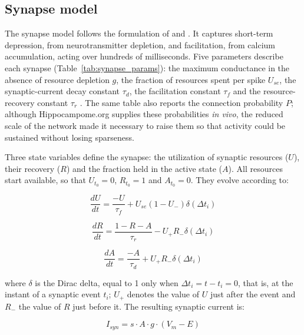 \documentclass[pdflatex,sn-basic]{sn-jnl}%
\theoremstyle{thmstyleone}%
\theoremstyle{thmstyletwo}%
\theoremstyle{thmstylethree}%
\begin{document}
\subsection{Synapse model}\label{sec:synapse_model}

The synapse model follows the formulation of \citet{sennAlgorithm2001} and \citet{mongilloSynaptic2008a}. It captures short-term
depression, from neurotransmitter depletion, and facilitation, from calcium accumulation, acting over hundreds of milliseconds.
Five parameters describe each synapse (Table~\ref{tab:synapse_params}): the maximum conductance in the absence of resource
depletion $g$, the fraction of resources spent per spike $U_{se}$, the synaptic-current decay constant $\tau_d$, the facilitation
constant $\tau_f$ and the resource-recovery constant $\tau_r$ \citep{moradiNormalized2022}. The same table also reports the
connection probability $P$; although Hippocampome.org supplies these probabilities \textit{in vivo}, the reduced scale of the
network made it necessary to raise them so that activity could be sustained without losing sparseness.

Three state variables define the synapse: the utilization of synaptic resources ($U$), their recovery ($R$) and the fraction held
in the active state ($A$). All resources start available, so that $U_{t_0} = 0$, $R_{t_0} = 1$ and $A_{t_0} = 0$. They evolve
according to:

\begin{equation}
    \label{eq_tsodyks_dU}
    \frac{dU}{dt} = \frac{-U}{\tau_f} + U_{se}(1-U_{-}) \delta(\Delta t_i)
\end{equation}

\begin{equation}
    \label{eq_tsodyks_dR}
    \frac{dR}{dt} = \frac{1-R-A}{\tau_r} - U_{+} R_{-} \delta(\Delta t_i)
\end{equation}

\begin{equation}
    \label{eq_tsodyks_dA}
    \frac{dA}{dt} = \frac{-A}{\tau_d} + U_{+} R_{-} \delta(\Delta t_i)
\end{equation}

where $\delta$ is the Dirac delta, equal to 1 only when $\Delta t_i = t - t_i = 0$, that is, at the instant of a synaptic event
$t_i$; $U_{+}$ denotes the value of $U$ just after the event and $R_{-}$ the value of $R$ just before it. The resulting synaptic
current is:

\begin{equation}
    \label{eq_tsodyks_I}
    I_{syn} = s \cdot A \cdot g \cdot (V_m - E)
\end{equation}
\end{document}

